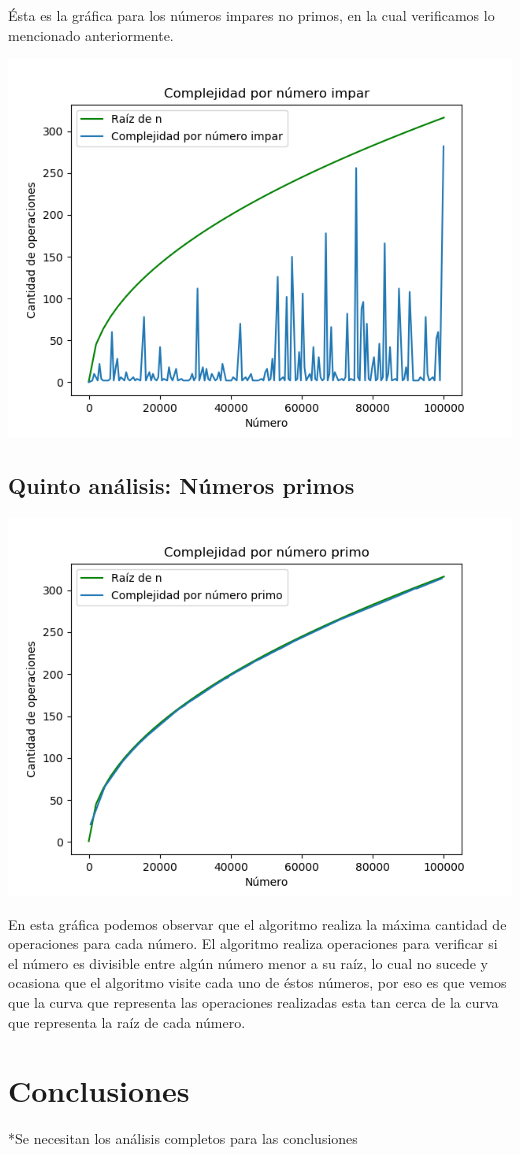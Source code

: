 \newpage \'Esta es la gr\'afica para los n\'umeros impares no primos, en la cual verificamos lo mencionado anteriormente.
\begin{center}
	\includegraphics[scale=0.6]{NumerosImpares.png}
\end{center}



\subsection{Quinto an\'alisis: N\'umeros primos}
\begin{center}
	\includegraphics[scale=0.6]{NumerosPrimos.png}
\end{center}
En esta gr\'afica podemos observar que el algoritmo realiza la m\'axima cantidad de operaciones para cada n\'umero. El algoritmo realiza operaciones para verificar si el n\'umero es divisible entre alg\'un n\'umero menor a su ra\'iz, lo cual no sucede y ocasiona que el algoritmo visite cada uno de \'estos n\'umeros, por eso es que vemos que la curva que representa las operaciones realizadas esta tan cerca de la curva que representa la ra\'iz de cada n\'umero.

\section{Conclusiones}
*Se necesitan los an\'alisis completos para las conclusiones


